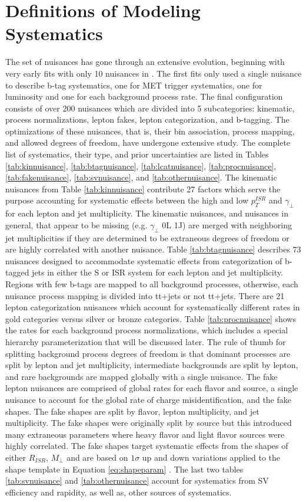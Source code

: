 \section{Definitions of Modeling Systematics}
The set of nuisances has gone through an extensive evolution, beginning with very early fits with only 10 nuisances in \cite{erich}. The first fits only used a single nuisance to describe b-tag systematics, one for MET trigger systematics, one for luminosity and one for each background process rate. The final configuration consists of over 200 nuisances which are divided into 5 subcategories: kinematic, process normalizations, lepton fakes, lepton categorization, and b-tagging. The optimizations of these nuisances, that is, their bin association, process mapping, and  allowed degrees of freedom, have undergone extensive study. The complete list of systematics, their type, and prior uncertainties are listed in Tables \ref{tab:kinnuisance}, \ref{tab:btagnuisance}, \ref{tab:lcatnuisance}, \ref{tab:procnuisance}, \ref{tab:fakenuisance}, \ref{tab:svnuisance}, and \ref{tab:othernuisance}.  The kinematic nuisances from Table \ref{tab:kinnuisance} contribute 27 factors which serve the purpose accounting for systematic effects between the high and low $p_T^{ISR}$ and $\gamma_\perp$ for each lepton and jet multiplicity. The kinematic nuisances, and nuisances in general, that appear to be missing (e.g. $\gamma_\perp$ 0L 1J) are merged with neighboring jet multiplicities if they are determined to be extraneous degrees of freedom or are highly correlated with another nuisance. Table \ref{tab:btagnuisance} describes 73 nuisances designed to accommodate systematic effects from categorization of b-tagged jets in either the S or ISR system for each lepton and jet multiplicity. Regions with few b-tags are mapped to all background processes, otherwise, each nuisance process mapping is divided into tt+jets or not tt+jets. There are 21 lepton categorization nuisances which account for systematically different rates in gold categories versus silver or bronze categories. Table \ref{tab:procnuisance} shows the rates for each background process normalizations, which includes a special hierarchy parameterization that will be discussed later. The rule of thumb for splitting background process degrees of freedom is that dominant processes are split by lepton and jet multiplicity, intermediate backgrounds are split by lepton, and rare backgrounds are mapped globally with a single nuisance. The fake lepton nuisances are comprised of global rates for each flavor and source, a single nuisance to account for the global rate of  charge misidentification, and the fake shapes. The fake shapes are split by flavor, lepton multiplicity, and jet multiplicity. The fake shapes were originally split by source but this introduced many extraneous parameters where heavy flavor and light flavor sources were highly correlated. The fake shapes target systematic effects from the shapes of either $R_{ISR}$, $M_\perp$ and are based on $1\sigma$ up and down variations applied to the shape template in Equation \ref{eq:shapeparam} \cite{margaret}. The last two tables \ref{tab:svnuisance} and \ref{tab:othernuisance} account for systematics from SV efficiency and rapidity, as well as, other sources of systematics.

